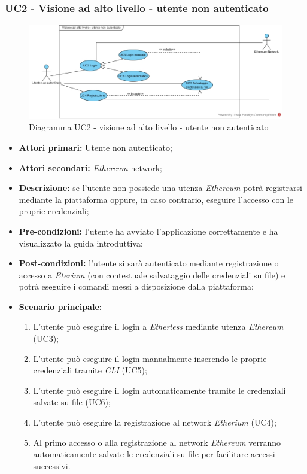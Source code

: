 \subsubsection{UC2 - Visione ad alto livello - utente non autenticato}
\begin{figure}[h]
	\centering
	\includegraphics[width=\linewidth]{res/img/utenteNonAutenticato.jpg}
	\caption{Diagramma UC2 - visione ad alto livello - utente non autenticato}
\end{figure}
\begin{itemize}
	\item \textbf{Attori primari:} Utente non autenticato;
	\item \textbf{Attori secondari:} \textit{Ethereum\glo} network;
	\item \textbf{Descrizione:} se l'utente non possiede una utenza \textit{Ethereum\glo} potrà registrarsi mediante la piattaforma oppure, in caso contrario, eseguire l'accesso con le proprie credenziali; 
	\item \textbf{Pre-condizioni:} l'utente ha avviato l'applicazione correttamente e ha visualizzato la guida introduttiva; 
	\item \textbf{Post-condizioni:} l'utente si sarà autenticato mediante registrazione o accesso a \textit{Eterium\glo} (con contestuale salvataggio delle credenziali su file) e potrà eseguire i comandi messi a disposizione dalla piattaforma;
	\item \textbf{Scenario principale:} 
	\begin{enumerate}
		\item L'utente può eseguire il login a \textit{Etherless} mediante utenza \textit{Ethereum\glo} (UC3);
		\item L'utente può eseguire il login manualmente inserendo le proprie credenziali tramite \textit{CLI\glo} (UC5);
		\item L'utente può eseguire il login automaticamente tramite le credenziali salvate su file (UC6);
		\item L'utente può eseguire la registrazione al network \textit{Etherium\glo} (UC4);
		\item Al primo accesso o alla registrazione al network \textit{Ethereum\glo} verranno automaticamente salvate le credenziali su file per facilitare accessi successivi.
	\end{enumerate}
\end{itemize}